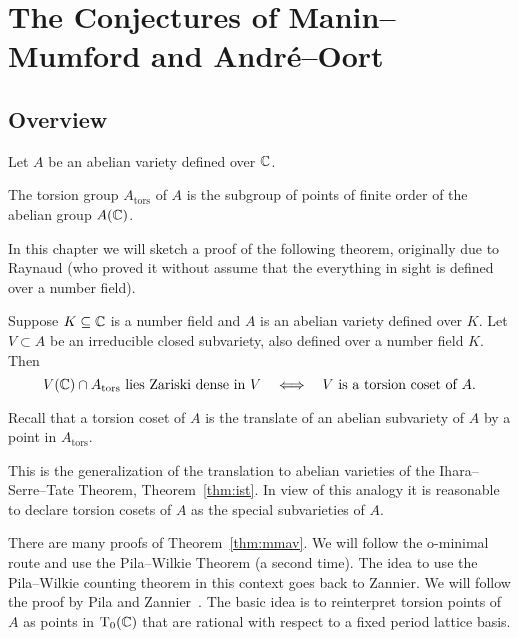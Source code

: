 \chapter{The Conjectures of Manin--Mumford and Andr\'e--Oort}

\section{Overview}

Let $A$ be an abelian variety defined over ${\mathbb{C}}$.

\begin{definition}
  The torsion group $A_{\mathrm{tors}}$ of $A$ is the subgroup of points
  of finite order of the abelian group $A({\mathbb{C}})$.
\end{definition}

In this chapter we will sketch a proof of the following theorem,
originally due to Raynaud (who proved it without assume that the
everything in sight is defined over a number field).

\begin{theorem}
  \label{thm:mmav}
  Suppose $K\subseteq{\mathbb{C}}$ is a number field and $A$ is an abelian
  variety defined over $K$. 
  Let $V\subset A$ be an irreducible closed subvariety, also defined over a
  number field $K$. Then
  \begin{equation*}
    V({\mathbb{C}}) \cap A_{\mathrm{tors}} \text{ lies Zariski dense in
      $V$}\quad\Longleftrightarrow \quad
    \text{$V$ is a torsion coset of $A$.}
  \end{equation*}
\end{theorem}

Recall that a torsion coset of $A$ is the translate of an abelian
subvariety of $A$ by a point in $A_{\mathrm{tors}}$. 

This is the generalization of the translation to abelian varieties of
the Ihara--Serre--Tate Theorem, Theorem~\ref{thm:ist}. In view of this
analogy it is reasonable to declare torsion cosets of $A$ as the
special subvarieties of $A$.

There are many proofs of Theorem~\ref{thm:mmav}. We will follow the
o-minimal route and use the Pila--Wilkie Theorem (a second time). The
idea to use the Pila--Wilkie counting theorem in this context goes
back to Zannier. We will follow the proof by Pila and
Zannier~\cite{PilaZannier}. The basic idea is to reinterpret torsion
points of $A$ as points in $\mathrm{T}_0({\mathbb{C}})$ that are rational with
respect to a fixed period lattice basis.


